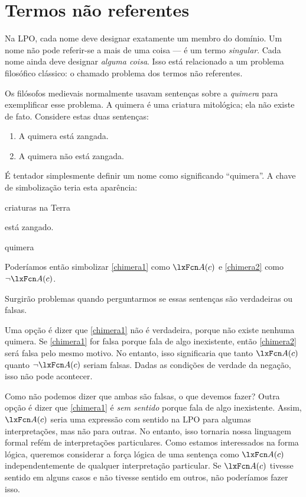 \section{Termos não referentes}

Na LPO, cada nome deve designar exatamente um membro do domínio. Um nome não pode referir-se a mais de uma coisa — é um termo \emph{singular}. Cada nome ainda deve designar \emph{alguma coisa}. Isso está relacionado a um problema filosófico clássico: o chamado problema dos termos não referentes.

Os filósofos medievais normalmente usavam sentenças sobre a \emph{quimera} para exemplificar esse problema. A quimera é uma criatura mitológica; ela não existe de fato. Considere estas duas sentenças:
\begin{enumerate}
\item\label{chimera1} A quimera está zangada.
\item\label{chimera2} A quimera não está zangada.
\end{enumerate}
É tentador simplesmente definir um nome como significando \textquotedblleft quimera\textquotedblright{}. A chave de simbolização teria esta aparência:
\begin{ekey}
\item[\text{domínio}] criaturas na Terra
\item[\atom{A}{x}]  está zangado.
\item[c] quimera
\end{ekey}
Poderíamos então simbolizar \cref*{chimera1} como $\atom{A}{c}$ e \cref*{chimera2} como $\enot \atom{A}{c}$.

Surgirão problemas quando perguntarmos se essas sentenças são verdadeiras ou falsas.

Uma opção é dizer que \cref*{chimera1} não é verdadeira, porque não existe nenhuma quimera. Se \cref*{chimera1} for falsa porque fala de algo inexistente, então \cref*{chimera2} será falsa pelo mesmo motivo. No entanto, isso significaria que tanto $\atom{A}{c}$ quanto $\enot \atom{A}{c}$ seriam falsas. Dadas as condições de verdade da negação, isso não pode acontecer.

Como não podemos dizer que ambas são falsas, o que devemos fazer? Outra opção é dizer que \cref*{chimera1} é \emph{sem sentido} porque fala de algo inexistente. Assim, $\atom{A}{c}$ seria uma expressão com sentido na LPO para algumas interpretações, mas não para outras. No entanto, isso tornaria nossa linguagem formal refém de interpretações particulares. Como estamos interessados na forma lógica, queremos considerar a força lógica de uma sentença como $\atom{A}{c}$ independentemente de qualquer interpretação particular. Se $\atom{A}{c}$ tivesse sentido em alguns casos e não tivesse sentido em outros, não poderíamos fazer isso.

